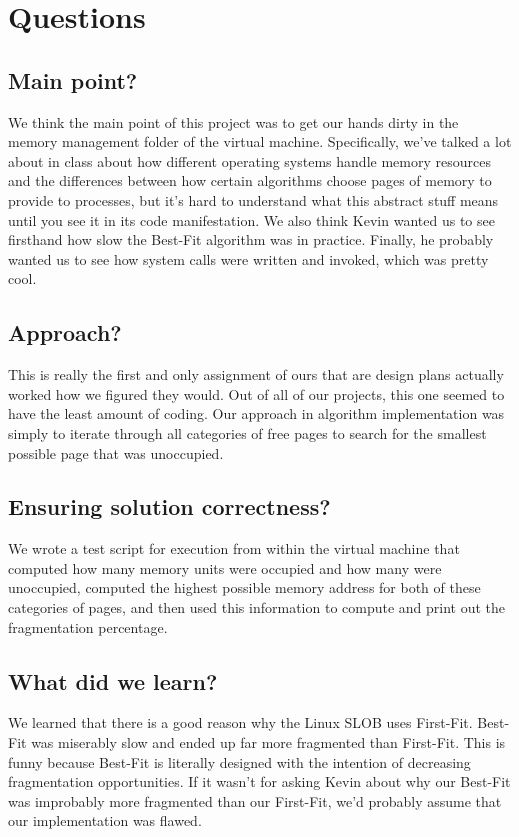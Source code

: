 \documentclass[letterpaper,10pt,titlepage]{article}
\begin{document}
\section{Questions}
\subsection{Main point?}
We think the main point of this project was to get our hands dirty in the memory management folder of the virtual machine. Specifically, we've talked a lot about in class about how different operating systems handle memory resources and the differences between how certain algorithms choose pages of memory to provide to processes, but it's hard to understand what this abstract stuff means until you see it in its code manifestation. We also think Kevin wanted us to see firsthand how slow the Best-Fit algorithm was in practice. Finally, he probably wanted us to see how system calls were written and invoked, which was pretty cool.
\subsection{Approach?}
This is really the first and only assignment of ours that are design plans actually worked how we figured they would. Out of all of our projects, this one seemed to have the least amount of coding. Our approach in algorithm implementation was simply to iterate through all categories of free pages to search for the smallest possible page that was unoccupied.
\subsection{Ensuring solution correctness?}
We wrote a test script for execution from within the virtual machine that computed how many memory units were occupied and how many were unoccupied, computed the highest possible memory address for both of these categories of pages, and then used this information to compute and print out the fragmentation percentage.
\subsection{What did we learn?}
We learned that there is a good reason why the Linux SLOB uses First-Fit. Best-Fit was miserably slow and ended up far more fragmented than First-Fit. This is funny because Best-Fit is literally designed with the intention of decreasing fragmentation opportunities. If it wasn't for asking Kevin about why our Best-Fit was improbably more fragmented than our First-Fit, we'd probably assume that our implementation was flawed.

%
%
\end{document}
